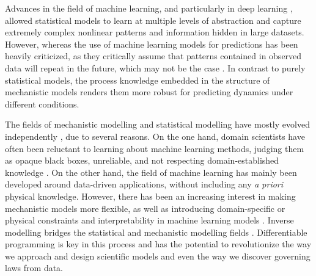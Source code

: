 Advances in the field of machine learning, and particularly in deep learning \cite{LeCun2015}, allowed statistical models to learn at multiple levels of abstraction and capture extremely complex nonlinear patterns and information hidden in large datasets. 
However, whereas the use of machine learning models for predictions has been heavily criticized, as they critically assume that patterns contained in observed data will repeat in the future, which may not be the case \cite{dormann2007,Barnosky2012}. 
In contrast to purely statistical models, the process knowledge embedded in the structure of mechanistic models renders them more robust for predicting dynamics under different conditions.


The fields of mechanistic modelling and statistical modelling have mostly evolved independently \cite{zdeborova_understanding_2020}, due to several reasons. 
On the one hand, domain scientists have often been reluctant to learning about machine learning methods, judging them as opaque black boxes, unreliable, and not respecting domain-established knowledge \cite{Coveney:2016eb}. 
On the other hand, the field of machine learning has mainly been developed around data-driven applications, without including any \textit{a priori} physical knowledge. 
However, there has been an increasing interest in making mechanistic models more flexible, as well as introducing domain-specific or physical constraints and interpretability in machine learning models \cite{Molnar.2020sisk,Rudin.2022,Schneider2017,rasp2018,Yazdani2020,Abarbanel2018,Carrassi2018,Bocquet2019,Gabor2015,Gharamti2017,Curtsdotter2019,Rosenbaum2019,Toms2020,Brajard2021}.
Inverse modelling bridges the statistical and mechanistic modelling fields \cite{Wigner.1960, Rude:2018jv, Tarantola:2007wu}. 
Differentiable programming is key in this process and has the potential to revolutionize the way we approach and design scientific models and even the way we discover governing laws from data.

